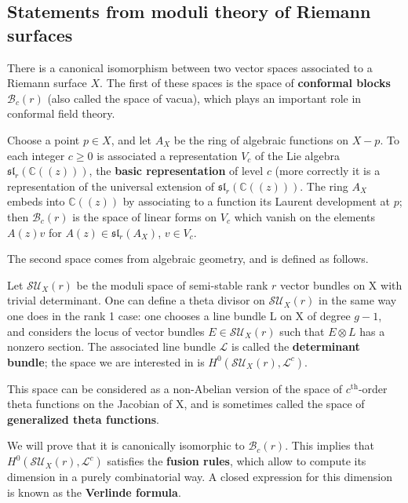 \documentclass[12pt]{article}
\begin{document}
\subsection{Statements from moduli theory of Riemann surfaces}


There is a canonical isomorphism between two vector spaces associated to a Riemann surface $X$. The first of these spaces is the space of \textbf{conformal blocks} $\mathcal{B}_c(r)$ (also called the space of vacua), which plays an important role in
conformal field theory.

\begin{definition}
    Choose a point $p \in X$, and let $A_X$ be the ring of algebraic functions on $X - p$. To each integer $c \geq 0$ is associated a representation $V_c$ of the Lie algebra $\mathfrak{sl}_r(\mathbb{C}((z)))$, the \textbf{basic representation} of level $c$ (more correctly it is a representation of the universal extension of $\mathfrak{sl}_r(\mathbb{C}((z)))$. The ring $A_X$ embeds into $\mathbb{C}((z))$ by associating to a function its Laurent development at $p$; then $\mathcal{B}_c(r)$ is the space of linear forms on $V_c$ which vanish on the elements $A(z)v$ for $A(z) \in \mathfrak{sl}_r(A_X)$, $v \in V_c$.
\end{definition}

The second space comes from algebraic geometry, and is defined as follows.

\begin{definition}
    Let $\mathcal{SU}_X(r)$ be the moduli space of semi-stable rank $r$ vector bundles on X with trivial
    determinant. One can define a theta divisor on $\mathcal{SU}_X(r)$ in the same way one does in the rank 1 case: one chooses a line bundle L on X of degree $g - 1$, and considers
    the locus of vector bundles $E \in \mathcal{SU}_X(r)$ such that $E \otimes L$ has a nonzero section. The
    associated line bundle $\mathcal{L}$ is called the \textbf{determinant bundle}; the space we are interested in
    is $H^0(\mathcal{SU}_X(r), \mathcal{L}^c)$.
\end{definition}
This space can be considered as a non-Abelian version of the space
of $c^{\text{th}}$-order theta functions on the Jacobian of X, and is sometimes called the space of \textbf{generalized theta functions}.

We will prove that it is canonically isomorphic to $\mathcal{B}_c(r)$. This implies that $H^0(\mathcal{SU}_X(r), \mathcal{L}^c)$ satisfies the \textbf{fusion rules}, which allow to compute its dimension in a purely combinatorial way. A closed expression for this dimension is known as the \textbf{Verlinde formula}.
\end{document}

